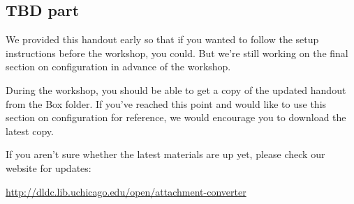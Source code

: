 \documentclass[11pt]{article}
\begin{document}
\subsection{TBD part}
\label{sec:orga360076}

We provided this handout early so that if you wanted to follow the
setup instructions before the workshop, you could.  But we're still
working on the final section on configuration in advance of the
workshop.

During the workshop, you should be able to get a copy of the updated
handout from the Box folder.  If you've reached this point and would
like to use this section on configuration for reference, we would
encourage you to download the latest copy.

If you aren't sure whether the latest materials are up yet, please
check our website for updates:

\url{http://dldc.lib.uchicago.edu/open/attachment-converter}
\end{document}
